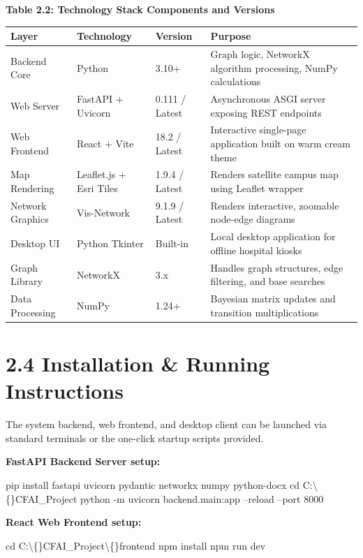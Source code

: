 \documentclass[12pt,a4paper]{report}
\begin{document}
\begin{center}\textbf{Table 2.2: Technology Stack Components and Versions}\end{center}
\begin{table}[htbp]
\centering
\small
\begin{tabularx}{\textwidth}{|l|l|l|X|}
\hline
Layer & Technology & Version & Purpose \\
\hline
\hline
Backend Core & Python & 3.10+ & Graph logic, NetworkX algorithm processing, NumPy calculations \\
\hline
Web Server & FastAPI + Uvicorn & 0.111 / Latest & Asynchronous ASGI server exposing REST endpoints \\
\hline
Web Frontend & React + Vite & 18.2 / Latest & Interactive single-page application built on warm cream theme \\
\hline
Map Rendering & Leaflet.js + Esri Tiles & 1.9.4 / Latest & Renders satellite campus map using Leaflet wrapper \\
\hline
Network Graphics & Vis-Network & 9.1.9 / Latest & Renders interactive, zoomable node-edge diagrams \\
\hline
Desktop UI & Python Tkinter & Built-in & Local desktop application for offline hospital kiosks \\
\hline
Graph Library & NetworkX & 3.x & Handles graph structures, edge filtering, and base searches \\
\hline
Data Processing & NumPy & 1.24+ & Bayesian matrix updates and transition multiplications \\
\hline
\end{tabularx}
\end{table}

\section{2.4 Installation \& Running Instructions}

The system backend, web frontend, and desktop client can be launched via standard terminals or the one-click startup scripts provided.

\textbf{FastAPI Backend Server setup:}

pip install fastapi uvicorn pydantic networkx numpy python-docx
cd C:\textbackslash\{\}CFAI\_Project
python -m uvicorn backend.main:app --reload --port 8000

\textbf{React Web Frontend setup:}

cd C:\textbackslash\{\}CFAI\_Project\textbackslash\{\}frontend
npm install
npm run dev
\end{document}
